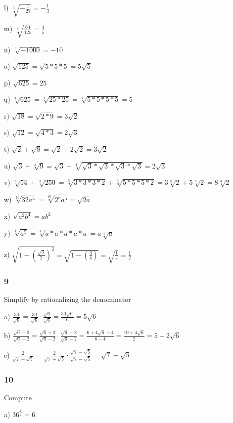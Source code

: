 \documentclass[]{report}
\begin{document}
l) $\sqrt[3]{-\frac{1}{27}} = -\frac{1}{3}$

m) $\sqrt[3]{\frac{64}{125}} = \frac{4}{5}$

n) $\sqrt[3]{-1000} = -10$ 

o) $\sqrt{125} = \sqrt{5 * 5 * 5} = 5\sqrt{5}$

p) $\sqrt{625} = 25$

q) $\sqrt[4]{625} = \sqrt[4]{25 * 25} = \sqrt[4]{5 * 5 * 5 * 5} = 5$

r) $\sqrt{18} = \sqrt{2 * 9} = 3\sqrt{2}$

s) $\sqrt{12} = \sqrt{4 * 3} = 2\sqrt{3}$

t) $\sqrt{2} + \sqrt{8} = \sqrt{2} + 2\sqrt{2} = 3\sqrt{2}$

u) $\sqrt{3} + \sqrt[4]{9} =  \sqrt{3} + \sqrt[4]{\sqrt{3} * \sqrt{3} * \sqrt{3} * \sqrt{3}} = 2\sqrt{3} $

v) $\sqrt[3]{54} + \sqrt[3]{250} = \sqrt[3]{3 * 3 * 3 * 2 } + \sqrt[3]{5 * 5 * 5 *2} = 3\sqrt[3]{2} + 5\sqrt[3]{2}  = 8\sqrt[3]2$

w) $\sqrt[10]{32a^5} = \sqrt[10]{2^5a^5} = \sqrt{2a}$

x) $\sqrt{a^2b^4} = ab^2$

y) $\sqrt[4]{a^5} = \sqrt[4]{a * a * a * a * a} = a \sqrt[4]{a}$

z) $\sqrt{1 - (\frac{\sqrt{3}}{2})^2} = \sqrt{1 - (\frac{3}{4})} = \sqrt{\frac{1}{4}}  = \frac{1}{2}$

\subsubsection{9}
Simplify by rationalizing the denominator


a) $\frac{30}{\sqrt{6}} = \frac{30}{\sqrt{6}} \cdot \frac{\sqrt{6}}{\sqrt{6}} = \frac{30\sqrt{6}}{6} = 5\sqrt{6}$

b) $\frac{\sqrt{6} + 2}{\sqrt{6} - 2} = \frac{\sqrt{6} + 2}{\sqrt{6} - 2} \cdot \frac{\sqrt{6} + 2}{\sqrt{6} + 2} = \frac{6 + 4\sqrt{6} + 4}{6 - 4} = \frac{10 + 4\sqrt{6}}{2} = 5 + 2\sqrt{6}$


c) $\frac{2}{\sqrt{7} + \sqrt{5}} = \frac{2}{\sqrt{7} + \sqrt{5}} \cdot  \frac{\sqrt{7} - \sqrt{5}}{\sqrt{7} - \sqrt{5}} = \sqrt{7} - \sqrt{5}$
	
\subsubsection{10}
Compute

a) $36^{\frac{1}{2}} = 6$
\end{document}
